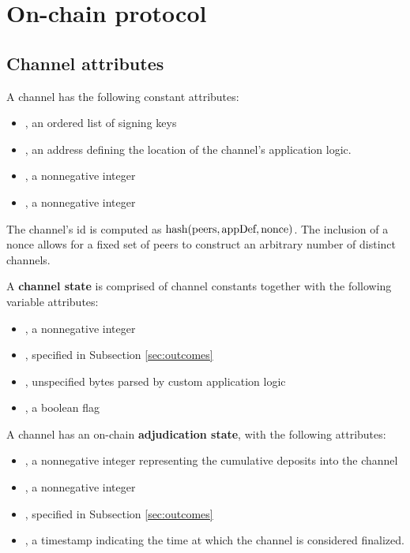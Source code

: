 \section{On-chain protocol}



\subsection{Channel attributes}

A channel has the following constant attributes:
\begin{itemize}
  \item \peers, an ordered list of signing keys
  \item \appDefinition, an address defining the location of the channel's application logic.
  \item \nonce, a nonnegative integer
  \item \challengeDuration, a nonnegative integer
\end{itemize}
The channel's id is computed as $\mbox{hash}(\mbox{peers}, \mbox{appDef}, \mbox{nonce})$. The inclusion of a nonce allows for a fixed set of peers to construct an arbitrary number of distinct channels.


A \textbf{channel state} is comprised of channel constants together with the following variable attributes:
\begin{itemize}
  \item \version, a nonnegative integer
  \item \outcome, specified in Subsection \ref{sec:outcomes}
  \item \appData, unspecified bytes parsed by custom application logic
  \item \isFinal, a boolean flag
\end{itemize}

A channel has an on-chain \textbf{adjudication state}, with the following attributes:
\begin{itemize}
  \item \holdings, a nonnegative integer representing the cumulative deposits into the channel
  \item \version, a nonnegative integer
  \item \outcome, specified in Subsection \ref{sec:outcomes}
  \item \finalizationTime, a timestamp indicating the time at which the channel is considered finalized.
\end{itemize}

